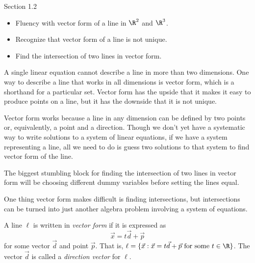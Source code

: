 \documentclass{problemset}
\begin{document}
\begin{lesson}
	\newpage

	Section 1.2

	\begin{itemize}
		\item Fluency with vector form of a line in $\R^2$ and $\R^3$.
		\item Recognize that vector form of a line is not unique.
		\item Find the intersection of two lines in vector form.
	\end{itemize}

	A single linear equation cannot describe a line in more than two dimensions.
	One way to describe a line that works in all dimensions is vector form, which
	is a shorthand for a particular set. Vector form has the upside that it makes it easy
	to produce points on a line, but it has the downside that it is not unique.

	Vector form works because a line in any dimension can be defined by two
	points or, equivalently, a point and a direction. Though we don't yet have
	a systematic way to write solutions to a system of linear equations,
	if we have a system representing a line, all we need to do is guess two
	solutions to that system to find vector form of the line.


	\begin{annotation}
		\begin{notes}
			The biggest stumbling block for finding the intersection of two lines
			in vector form will be choosing different dummy variables before
			setting the lines equal. 
		\end{notes}
	\end{annotation}
	One thing vector form makes difficult is finding intersections, but intersections
	can be turned into just another algebra problem involving a system of equations.

	\newpage
\end{lesson}

	\newpage
	\begin{definition}
		A line $\ell$ is written in \emph{vector form} if it is expressed
		as
		\[
			\vec x=t\vec d+\vec p
		\]
		for some vector $\vec d$ and point $\vec p$. That is, $\ell = \{\vec x: \vec x=
		t\vec d+\vec p\text{ for some } t\in\R \}$. The vector 
		$\vec d$ is called a \emph{direction
		vector} for $\ell$.
	\end{definition}
\end{document}
